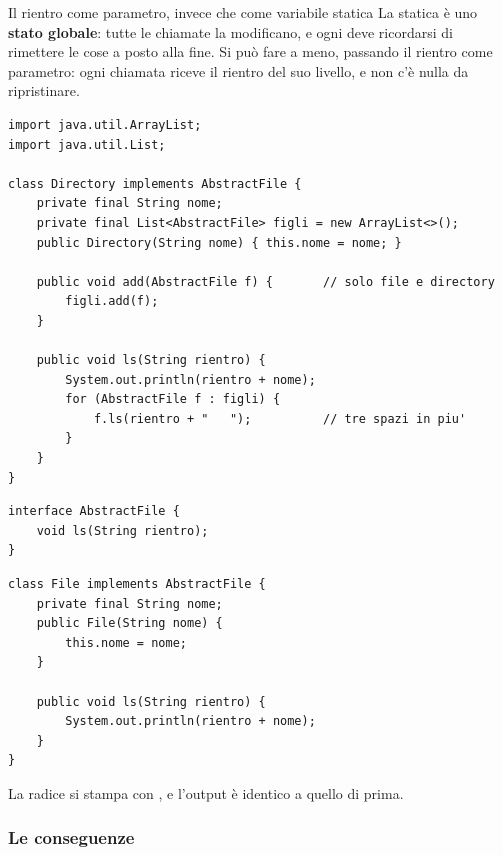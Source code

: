 \begin{esempio}{Il rientro come parametro, invece che come variabile statica}
La  statica è uno \textbf{stato globale}: tutte le chiamate la modificano, e ogni  deve
ricordarsi di rimettere le cose a posto alla fine. Si può fare a meno, passando il rientro come parametro: ogni chiamata
riceve il rientro del suo livello, e non c'è nulla da ripristinare.

\begin{lstlisting}[style=java, name=Directory.java]
import java.util.ArrayList;
import java.util.List;

class Directory implements AbstractFile {
    private final String nome;
    private final List<AbstractFile> figli = new ArrayList<>();
    public Directory(String nome) { this.nome = nome; }

    public void add(AbstractFile f) {       // solo file e directory
        figli.add(f);
    }

    public void ls(String rientro) {
        System.out.println(rientro + nome);
        for (AbstractFile f : figli) {
            f.ls(rientro + "   ");          // tre spazi in piu'
        }
    }
}
\end{lstlisting}
\noindent\begin{minipage}[t]{0.49\textwidth}
\begin{lstlisting}[style=java, name=AbstractFile.java]
interface AbstractFile {
    void ls(String rientro);
}
\end{lstlisting}
\end{minipage}\hfill
\begin{minipage}[t]{0.49\textwidth}
\begin{lstlisting}[style=java, name=File.java]
class File implements AbstractFile {
    private final String nome;
    public File(String nome) {
        this.nome = nome;
    }

    public void ls(String rientro) {
        System.out.println(rientro + nome);
    }
}
\end{lstlisting}
\end{minipage}

\medskip
La radice si stampa con , e l'output è identico a quello di prima.
\end{esempio}

\subsubsection*{Le conseguenze}

